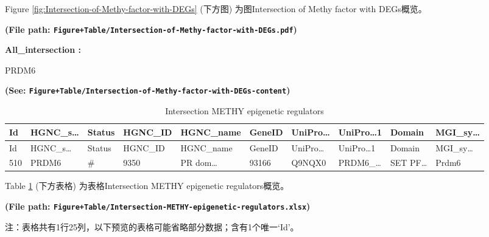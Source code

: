 \documentclass[
]{article}
\begin{document}
Figure \ref{fig:Intersection-of-Methy-factor-with-DEGs} (下方图) 为图Intersection of Methy factor with DEGs概览。

\textbf{(File path: \texttt{Figure+Table/Intersection-of-Methy-factor-with-DEGs.pdf})}

\begin{center}\vspace{1.5cm}\end{center}\begin{center}\begin{tcolorbox}[colback=gray!10, colframe=gray!50, width=0.9\linewidth, arc=1mm, boxrule=0.5pt]
\textbf{
All\_intersection
:}

\vspace{0.5em}

    PRDM6

\vspace{2em}
\end{tcolorbox}
\end{center}

\textbf{(See: \texttt{Figure+Table/Intersection-of-Methy-factor-with-DEGs-content})}

\begin{center}\vspace{1.5cm}\end{center}

\begin{longtable}[]{@{}llllllllll@{}}
\caption{\label{tab:Intersection-METHY-epigenetic-regulators}Intersection METHY epigenetic regulators}\tabularnewline
\toprule
Id & HGNC\_s\ldots{} & Status & HGNC\_ID & HGNC\_name & GeneID & UniPro\ldots{} & UniPro\ldots1 & Domain & MGI\_sy\ldots{}\tabularnewline
\midrule
\endfirsthead
\toprule
Id & HGNC\_s\ldots{} & Status & HGNC\_ID & HGNC\_name & GeneID & UniPro\ldots{} & UniPro\ldots1 & Domain & MGI\_sy\ldots{}\tabularnewline
\midrule
\endhead
510 & PRDM6 & \# & 9350 & PR dom\ldots{} & 93166 & Q9NQX0 & PRDM6\_\ldots{} & SET PF\ldots{} & Prdm6\tabularnewline
\bottomrule
\end{longtable}

Table \ref{tab:Intersection-METHY-epigenetic-regulators} (下方表格) 为表格Intersection METHY epigenetic regulators概览。

\textbf{(File path: \texttt{Figure+Table/Intersection-METHY-epigenetic-regulators.xlsx})}

\begin{center}\begin{tcolorbox}[colback=gray!10, colframe=gray!50, width=0.9\linewidth, arc=1mm, boxrule=0.5pt]注：表格共有1行25列，以下预览的表格可能省略部分数据；含有1个唯一`Id'。
\end{tcolorbox}
\end{center}
\end{document}
